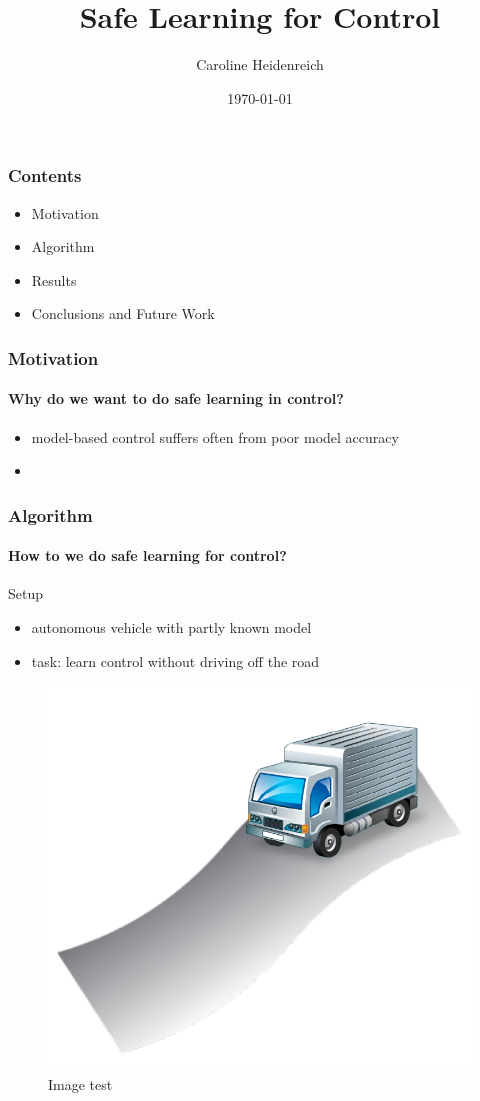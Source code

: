 \documentclass[t]{beamer}
\title[Inisintiur sequi aliquia tis dis in para] 
{%
  Safe Learning for Control%
}
\author[Oskar, Friends]
{
Caroline Heidenreich
}
\institute{}
\date{\today}
\begin{document}
\begin{frame}
\titlepage
\end{frame}


\begin{frame}
\frametitle{Contents}

\begin{itemize}
\item Motivation
\item Algorithm
\item Results
\item Conclusions and Future Work
\end{itemize}
\end{frame}

\begin{frame}
\frametitle{Motivation}
\framesubtitle{Why do we want to do safe learning in control?}
\begin{itemize}
\item model-based control suffers often from poor model accuracy
\item 
\end{itemize}

\end{frame}


\begin{frame}
\frametitle{Algorithm}
\framesubtitle{How to we do safe learning for control?}
Setup
\begin{itemize}
\item autonomous vehicle with partly known model
\item task: learn control without driving off the road
\end{itemize}

\begin{figure}[h!]
\includegraphics[trim=0mm 0mm 0mm 0mm, width=0.4\paperwidth]{TruckOnStreet}
\caption{Image test}
\end{figure}


\end{frame}
\end{document}
